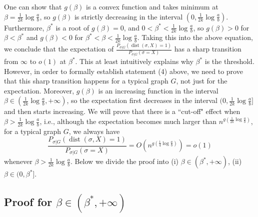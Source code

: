 \documentclass[conference]{IEEEtran}
\DeclareMathOperator{\dist}{dist}
\begin{document}
One can show that $g(\beta)$ is a convex function and takes minimum at $\beta=\frac{1}{2k}\log\frac{a}{b}$, so $g(\beta)$ is strictly decreasing in the interval $(0,\frac{1}{2k}\log\frac{a}{b})$. Furthermore, $\beta^\ast$ is a root of $g(\beta)=0$, and $0<\beta^\ast<\frac{1}{2k}\log\frac{a}{b}$, so $g(\beta)>0$ for $\beta<\beta^\ast$ and $g(\beta)<0$ for $\beta^\ast<\beta<\frac{1}{2k}\log\frac{a}{b}$.
Taking this into the above equation, we conclude that the expectation of $\frac{P_{\sigma|G} ( \dist(\sigma, X) = 1 )}{P_{\sigma|G}(\sigma= X)}$ has a sharp transition from $\infty$ to $o(1)$ at $\beta^\ast$.
This at least intuitively explains why $\beta^\ast$ is the threshold. However, in order to formally establish statement (4) above, we need to prove that this sharp transition happens for a typical graph $G$, not just for the expectation.
Moreover, $g(\beta)$ is an increasing function in the interval $\beta\in(\frac{1}{2k}\log\frac{a}{b}, +\infty)$, so the expectation first decreases in the interval $(0,\frac{1}{2k}\log\frac{a}{b}]$ and then starts increasing. We will prove that there is a ``cut-off" effect when $\beta>\frac{1}{2k}\log\frac{a}{b}$, i.e., although the expectation becomes much larger than $n^{g(\frac{1}{2k}\log\frac{a}{b})}$, for a typical graph $G$, we always have
$$
\frac{P_{\sigma|G} ( \dist(\sigma, X) = 1 )}{P_{\sigma|G}(\sigma= X)} 
= O( n^{g(\frac{1}{4}\log\frac{a}{b})} ) =o(1)
$$
whenever $\beta>\frac{1}{2k}\log\frac{a}{b}$.
Below we divide the proof into (i) $\beta\in(\beta^\ast,+\infty)$, (ii) $\beta\in(0,\beta^\ast]$.

\subsection{Proof for $\beta\in(\beta^*,+\infty)$}
\end{document}
